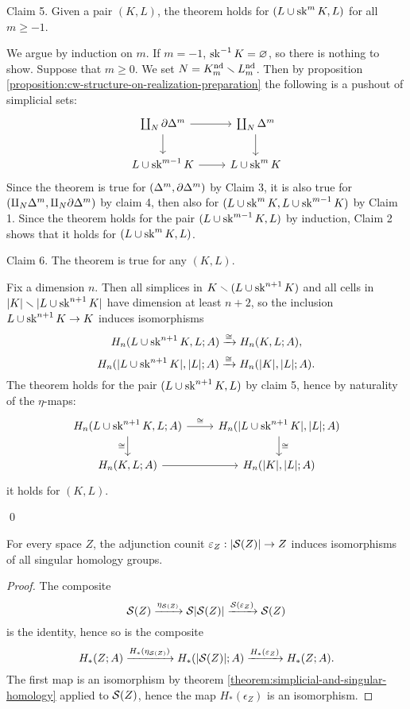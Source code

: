 

Claim 5. Given a pair $(K,L)$, the theorem holds for $(L\cup\sk^m K,L)$ for all $m\ge-1$.

\begin{claimproof}
We argue by induction on $m$. If $m=-1$, $\sk^\inv K=\emptyset$, so there is nothing to show. Suppose that $m\ge0$. We set $N=K^\text{nd}_m\sm L^\text{nd}_m$. Then by proposition \ref{proposition:cw-structure-on-realization-preparation} the following is a pushout of simplicial sets:
\[
\begin{tikzcd}
\coprod_N\de\Delta^m \ar[d] \ar[r] & \coprod_N\Delta^m \ar[d]\\
L\cup\sk^{m-1}K \ar[r] & L\cup\sk^mK
\end{tikzcd}
\]
Since the theorem is true for $(\Delta^m,\de\Delta^m)$ by Claim 3, it is also true for $(\amalg_N\Delta^m,\amalg_N\de\Delta^m)$ by claim 4, then also for $(L\cup\sk^m K,L\cup\sk^{m-1}K)$ by Claim 1. Since the theorem holds for the pair $(L\cup\sk^{m-1}K,L)$ by induction, Claim 2 shows that it holds for $(L\cup\sk^mK,L)$.
\end{claimproof}

Claim 6. The theorem is true for any $(K,L)$.

\begin{claimproof}
Fix a dimension $n$. Then all simplices in $K\sm(L\cup\sk^{n+1}K)$ and all cells in $|K|\sm|L\cup\sk^{n+1}K|$ have dimension at least $n+2$, so the inclusion $L\cup\sk^{n+1}K\to K$ induces isomorphisms
\[H_n(L\cup\sk^{n+1} K,L;A)\xto{\cong}H_n(K,L;A),\] \[H_n(|L\cup\sk^{n+1} K|,|L|;A)\xto{\cong}H_n(|K|,|L|;A).\]
The theorem holds for the pair $(L\cup\sk^{n+1}K,L)$ by claim 5, hence by naturality of the $\eta$-maps:
\[
\begin{tikzcd}
H_n(L\cup\sk^{n+1}K,L;A) \ar[d,"\cong"'] \ar[r,"\cong"] & H_n(|L\cup\sk^{n+1}K|,|L|;A) \ar[d,"\cong"]\\
H_n(K,L;A) \ar[r] & H_n(|K|,|L|;A)
\end{tikzcd}
\]
it holds for $(K,L)$.
\end{claimproof}\qed

\begin{corollary}\label{corollary:adjunction-counit-is-a-weak-equivalence}
For every space $Z$, the adjunction counit $\epsilon_Z:|\S(Z)|\to Z$ induces isomorphisms of all singular homology groups.
\end{corollary}

\begin{proof}
The composite
\[\S(Z)\xto{\eta_{\S(Z)}}\S|\S(Z)|\xto{\S(\epsilon_Z)}\S(Z)\]
is the identity, hence so is the composite
\[H_*(Z;A)\xto{H_*(\eta_{\S(Z)})}H_*(|\S(Z)|;A)\xto{H_*(\epsilon_Z)}H_*(Z;A).\]
The first map is an isomorphism by theorem \ref{theorem:simplicial-and-singular-homology} applied to $\S(Z)$, hence the map $H_*(\epsilon_Z)$ is an isomorphism.
\end{proof}

